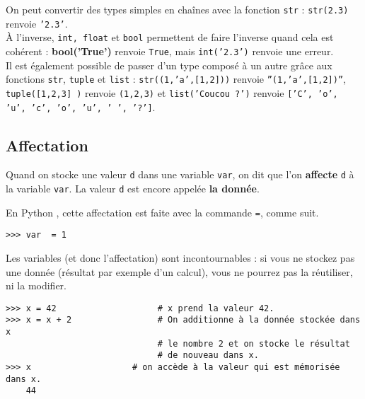 On peut convertir des types simples en chaînes avec la fonction \texttt{str} : \texttt{str(2.3)} 
renvoie \texttt{'2.3'}.\\
À l'inverse, \texttt{int, float} et \texttt{bool} permettent de faire l'inverse quand cela est 
cohérent : \textbf{bool('True')} renvoie \texttt{True}, mais \texttt{int('2.3')} renvoie une 
erreur.\\

Il est également possible de passer d'un type composé à un autre grâce aux fonctions \texttt{str}, 
\texttt{tuple} et \texttt{list} : \texttt{str((1,'a',[1,2]))} renvoie \texttt{''(1,'a',[1,2])''}, 
\texttt{tuple([1,2,3] )} renvoie \texttt{(1,2,3)} et \texttt{list('Coucou ?')} renvoie 
\texttt{['C', 'o', 'u', 'c', 'o', 'u', ' ', '?']}.

\subsection{Affectation}

\begin{defi}[Affectation]
Quand on stocke une valeur \texttt{d} dans une variable \texttt{var}, on dit que l'on 
\textbf{affecte} \texttt{d} à la variable \texttt{var}. La valeur
\texttt{d} est encore appelée \textbf{la donnée}.
\end{defi}

En Python , cette affectation est faite avec la commande \lstinline{=}, comme suit.  

\begin{lstlisting}
>>> var  = 1
\end{lstlisting}


Les variables (et donc l'affectation) sont incontournables : si vous ne stockez pas une donnée 
(résultat par exemple d'un calcul), vous ne pourrez pas la réutiliser, ni la modifier.

\begin{lstlisting}
>>> x = 42                    # x prend la valeur 42.
>>> x = x + 2                 # On additionne à la donnée stockée dans x 
                              # le nombre 2 et on stocke le résultat  
                              # de nouveau dans x.
>>> x                    # on accède à la valeur qui est mémorisée dans x.
	44
\end{lstlisting}

